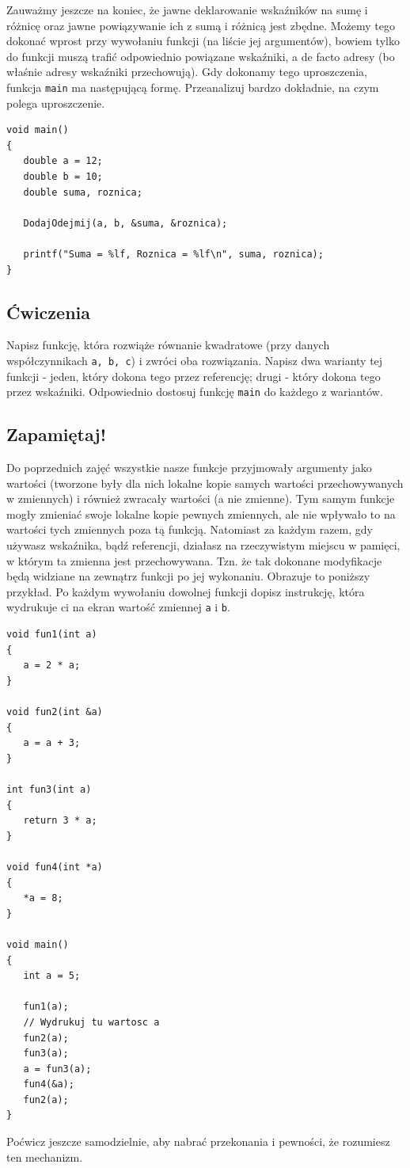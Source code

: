 \documentclass{instrukcja}
\begin{document}
Zauważmy jeszcze na koniec, że jawne deklarowanie wskaźników na sumę i różnicę oraz jawne powiązywanie ich z sumą i różnicą jest zbędne. Możemy tego dokonać wprost przy wywołaniu funkcji (na liście jej argumentów), bowiem tylko do funkcji muszą trafić odpowiednio powiązane wskaźniki, a de facto adresy (bo właśnie adresy wskaźniki przechowują). Gdy dokonamy tego uproszczenia, funkcja {\tt main} ma następującą formę. Przeanalizuj bardzo dokładnie, na czym polega uproszczenie.
\begin{verbatim}
void main()
{
   double a = 12;
   double b = 10;
   double suma, roznica;

   DodajOdejmij(a, b, &suma, &roznica);

   printf("Suma = %lf, Roznica = %lf\n", suma, roznica);
}
\end{verbatim}

\subsection*{Ćwiczenia}
Napisz funkcję, która rozwiąże równanie kwadratowe (przy danych współczynnikach {\tt a, b, c}) i zwróci oba rozwiązania. Napisz dwa warianty tej funkcji - jeden, który dokona tego przez referencję; drugi - który dokona tego przez wskaźniki. Odpowiednio dostosuj funkcję {\tt main} do każdego z wariantów.
\subsection*{Zapamiętaj!}
Do poprzednich zajęć wszystkie nasze funkcje przyjmowały argumenty jako wartości (tworzone były dla nich lokalne kopie samych wartości przechowywanych w zmiennych) i również zwracały wartości (a nie zmienne). Tym samym funkcje mogły zmieniać swoje lokalne kopie pewnych zmiennych, ale nie wpływało to na wartości tych zmiennych poza tą funkcją. Natomiast za każdym razem, gdy używasz wskaźnika, bądź referencji, działasz na rzeczywistym miejscu w pamięci, w którym ta zmienna jest przechowywana. Tzn. że tak dokonane modyfikacje będą widziane na zewnątrz funkcji po jej wykonaniu. Obrazuje to poniższy przykład. Po każdym wywołaniu dowolnej funkcji dopisz instrukcję, która wydrukuje ci na ekran wartość zmiennej {\tt a} i {\tt b}.
\begin{verbatim}
void fun1(int a)
{
   a = 2 * a;
}

void fun2(int &a)
{
   a = a + 3;
}

int fun3(int a)
{
   return 3 * a;
}

void fun4(int *a)
{
   *a = 8;
}

void main()
{
   int a = 5;

   fun1(a);
   // Wydrukuj tu wartosc a
   fun2(a);
   fun3(a);
   a = fun3(a);
   fun4(&a);
   fun2(a);
}
\end{verbatim}
Poćwicz jeszcze samodzielnie, aby nabrać przekonania i pewności, że rozumiesz ten mechanizm.
\end{document}

